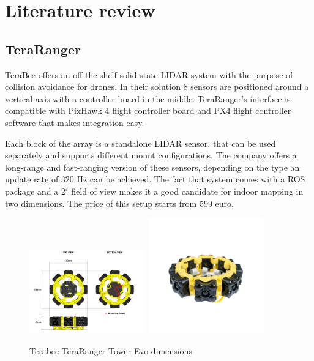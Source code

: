 \chapter{Literature review}

\section{TeraRanger}
TeraBee offers an off-the-shelf solid-state LIDAR system with the purpose of collision avoidance for drones.
In their solution 8 sensors are positioned around a vertical axis with a controller board in the middle. 
TeraRanger's interface is compatible with PixHawk 4 flight controller board and PX4 flight controller 
software that makes integration easy.

Each block of the array is a standalone LIDAR sensor, that can be used separately and supports different
mount configurations. The company offers a long-range and fast-ranging version of these sensors, depending 
on the type an update rate of 320 Hz can be achieved. The fact that system comes with a ROS package and a 
2$^{\circ}$ field of view makes it a good candidate for indoor mapping in two dimensions. The price of this setup 
starts from 599 euro. \cite{TerabeeTeraRanger}

\begin{figure}[!ht]
    \centering
    \includegraphics[width=50mm, keepaspectratio]{figures/tera_ranger_tower.png}\hspace{1cm}
    \includegraphics[width=50mm, keepaspectratio]{figures/tera_ranger_tower_2.png}
    \caption{Terabee TeraRanger Tower Evo dimensions}
    \label{fig:teraranger_dimensions}
\end{figure}

